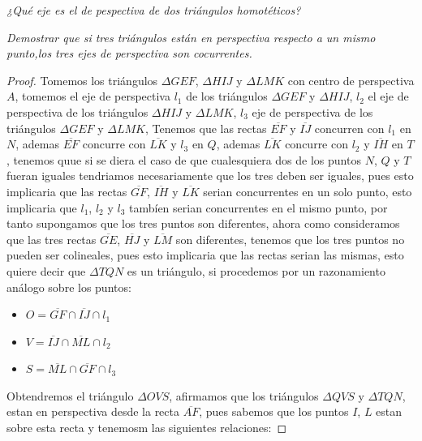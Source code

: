 \documentclass[11pt]{article}
\begin{document}
\begin{tcolorbox}[
	title = \textcolor{black}{\textcolor{white}{Problema 1}},]
\textit{¿Qu\'e eje es el de pespectiva de dos tri\'angulos homot\'eticos?}
\end{tcolorbox}

\begin{tcolorbox}[
	title = \textcolor{black}{\textcolor{white}{Problema 2}},]
\textit{Demostrar que si tres tri\'angulos est\'an en perspectiva respecto a un mismo punto,los tres ejes de perspectiva son cocurrentes.}
\end{tcolorbox}
\begin{proof}
    Tomemos los tri\'angulos $\Delta GEF$, $\Delta HIJ$ y $\Delta LMK$ con centro de perspectiva $A$, tomemos el eje de perspectiva $l_1$ de los tri\'angulos $\Delta GEF$ y $\Delta HIJ$, $l_2$ el eje de perspectiva de los tri\'angulos $\Delta HIJ$ y $\Delta LMK$, $l_3$ eje de perspectiva de los tri\'angulos $\Delta GEF$ y $\Delta LMK$,
    Tenemos que las rectas $\overline{EF}$ y $\overline{IJ}$ concurren con $l_1$ en $N$, ademas $\overline{EF}$ concurre con $\overline{LK}$ y $l_3$ en $Q$, ademas $\overline{LK}$ concurre con $l_2$ y $\overline{IH}$ en $T$, tenemos quue si se diera el caso de que cualesquiera dos de los puntos $N$, $Q$ y $T$ fueran iguales tendriamos necesariamente que los tres deben ser iguales, pues esto implicaria que las rectas $\overline{GF}$, $\overline{IH}$ y $\overline{LK}$ serian concurrentes en un solo punto, esto implicaria que $l_1$, $l_2$ y $l_3$ tamb\'ien serian concurrentes en el mismo punto, por tanto supongamos que los tres puntos son diferentes,
    ahora como consideramos que las tres rectas $\overline{GE}$, $\overline{HJ}$ y $\overline{LM}$ son diferentes, tenemos que los tres puntos no pueden ser colineales, pues esto implicaria que las rectas serian las mismas, esto quiere decir que $\Delta TQN$ es un tri\'angulo, si procedemos por un razonamiento an\'alogo sobre los puntos:
    \begin{itemize}
        \item $O=\overline{GF}\cap \overline{IJ}\cap l_1$
        \item $V=\overline{IJ}\cap \overline{ML}\cap l_2$
        \item $S=\overline{ML}\cap \overline{GF}\cap l_3$
    \end{itemize}
    Obtendremos el tri\'angulo $\Delta OVS$, afirmamos que los tri\'angulos $\Delta QVS$ y $\Delta TQN$, estan en perspectiva desde la recta $\overline{AF}$, pues sabemos que los puntos $I$, $L$ estan sobre esta recta y tenemosm las siguientes relaciones:

\end{proof}
\end{document}
